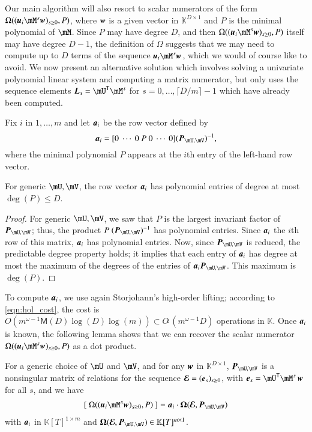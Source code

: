 \documentclass[final,1p,times,authoryear]{elsarticle}
\newcommand{\var}{T} %
\newcommand{\mat}[1]{\bm{\MakeUppercase{#1}}} %
\newcommand{\row}[1]{\bm{\MakeLowercase{#1}}} %
\newcommand{\col}[1]{\bm{\MakeLowercase{#1}}} %
\newcommand{\softO}[1]{O{\tilde{~}}(#1)} %
\newcommand{\minpoly}{P}
\newcommand{\trsp}[1]{#1^{\mathsf{T}}} %
\def\M {\ensuremath{\mathsf{M}}}
\def\K{\mathbb{K}}
\def\K {\ensuremath{\mathbb{K}}}
\newcommand{\mUt}{\trsp{\mU}}
\begin{document}
Our main algorithm will also resort to scalar numerators of
the form $\Omega((\row{u}_i \mM^s \col{w})_{s \ge 0},
\minpoly)$, where $\row{w}$ is a given vector in $\K^{D \times 1}$ and
$\minpoly$ is the minimal polynomial of $\mM$. Since $\minpoly$ may
have degree $D$, and then $\Omega((\row{u}_i \mM^s \col{w})_{s \ge 0},
\minpoly)$ itself may have degree $D-1$,
the definition of $\Omega$ suggests that we
may need to compute up to $D$ terms of the sequence $\row{u}_i \mM^s
\col{w}$, which we would of course like to avoid. We now present an
alternative solution which involves solving a univariate polynomial linear system
and computing a matrix numerator, but only uses the sequence elements
$\mat{L}_s= \mUt \mM^s$ for $s=0,\dots,\lceil D/m \rceil-1$
which have already been computed.

Fix $i$ in $1,\dots,m$ and let $\row{a}_i$ be the row vector defined
by $$\row{a}_i =[0~\cdots~0~\minpoly~0~\cdots~0]  (\mat{P}_{\mU,\mV})^{-1} ,$$
where the minimal polynomial $\minpoly$ appears at the $i$th entry  of the
left-hand row vector. 
\begin{lemma}\label{utilde}
  For generic $\mU,\mV$, the row vector $\row{a}_i$ has polynomial
  entries of degree at most~$\deg(P) \le D$.
\end{lemma}
\begin{proof}
  For generic $\mU,\mV$, we saw that $\minpoly$ is the largest invariant factor
  of $ \mat{P}_{\mU,\mV}$; thus, the product $\minpoly\
  (\mat{P}_{\mU,\mV})^{-1}$ has polynomial entries. Since $\row{a}_i$ the $i$th
  row of this matrix, $\row{a}_i$ has polynomial entries.  Now, since
  $\mat{P}_{\mU,\mV}$ is reduced, the predictable degree property
  \citep[Theorem~6.3-13]{Kailath80} holds; it implies that each entry of
  $\row{a}_i$ has degree at most the maximum of the degrees of the entries of
  $\row{a}_i\mat{P}_{\mU,\mV}$. This maximum is $\deg(\minpoly)$.
\end{proof}
To compute $\row{a}_i$, we use again Storjohann's high-order lifting;
according to \cref{eqn:hol_cost}, the cost is $ O(m^{\omega-1} \M(D)
\log(D) \log(m)) \subset \softO{m^{\omega-1}D}$ operations in $\K$.
Once $\row{a}_i$ is known, the following lemma shows that we can
recover the scalar numerator $\Omega((\row{u}_i \mM^s \col{w})_{s \ge
0}, \minpoly)$ as a dot product.
\begin{lemma}\label{lemma:omegaOmega}
  For a generic choice of $\mU$ and $\mV$, and for any $\col{w}$ in
  $\K^{D \times 1}$, $ \mat{P}_{\mU,\mV}$ is a nonsingular matrix of
  relations for the sequence $\mat{\mathcal{E}} =
  (\col{e}_s)_{s\ge0}$, with $\col{e}_s=\mUt \mM^s\, \col{w}$
  for all $s$, and we have
  \begin{align}\label{eq:OmegaOmega}
    [~\Omega((\row{u}_i \mM^s \col{w})_{s \ge 0}, \minpoly)~] = \row{a}_i\cdot \mat{\Omega}(\mat{\mathcal{E}}, \mat{P}_{\mU,\mV})
  \end{align}
  with $\row{a}_i$ in $\K[\var]^{1 \times m}$ and 
  $\mat{\Omega}(\mat{\mathcal{E}} , \mat{P}_{\mU,\mV}) \in \K[\var]^{m \times 1}$.
\end{lemma}
\end{document}
